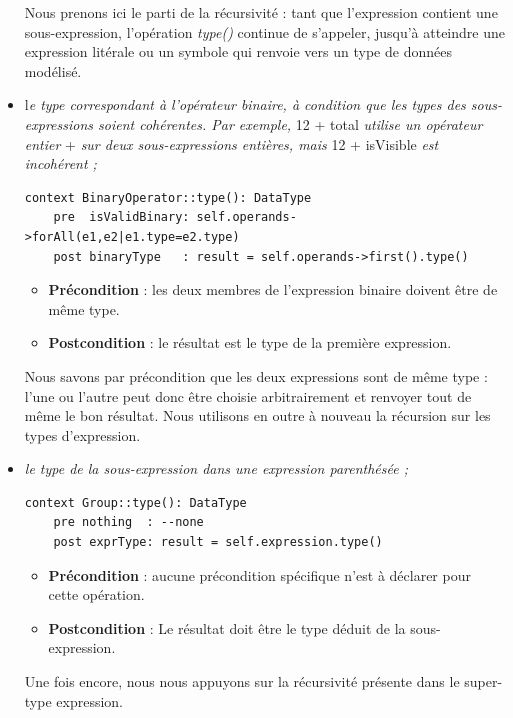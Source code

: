 \documentclass[oneside,a4paper]{book}
\begin{document}
\begin{itemize}
    Nous prenons ici le parti de la récursivité : tant que l'expression contient une sous-expression, l'opération \textit{type()} continue de s'appeler, jusqu'à atteindre une expression litérale ou un symbole qui renvoie vers un type de données modélisé.

    \item l\textit{e type correspondant à l'opérateur binaire, à condition que les types des sous-expressions soient cohérentes. Par exemple,} 12 + total \textit{utilise un opérateur entier} + \textit{sur deux sous-expressions entières, mais} 12 + isVisible \textit{est incohérent ;}
    \begin{lstlisting}
context BinaryOperator::type(): DataType
    pre  isValidBinary: self.operands->forAll(e1,e2|e1.type=e2.type)
    post binaryType   : result = self.operands->first().type()
    \end{lstlisting}

    \begin{itemize}
        \item \textbf{Précondition} : les deux membres de l'expression binaire doivent être de même type.
        \item \textbf{Postcondition} : le résultat est le type de la première expression. 
    \end{itemize}
    
    Nous savons par précondition que les deux expressions sont de même type : l'une ou l'autre peut donc être choisie arbitrairement et renvoyer tout de même le bon résultat. Nous utilisons en outre à nouveau la récursion sur les types d'expression.

    \item \textit{le type de la sous-expression dans une expression parenthésée ;}
    \begin{lstlisting}
context Group::type(): DataType
    pre nothing  : --none
    post exprType: result = self.expression.type()
    \end{lstlisting}
    \begin{itemize}
        \item \textbf{Précondition} : aucune précondition spécifique n'est à déclarer pour cette opération.
        \item \textbf{Postcondition} : Le résultat doit être le type déduit de la sous-expression.
    \end{itemize}
    
    Une fois encore, nous nous appuyons sur la récursivité présente dans le super-type expression.


\end{itemize}
\end{document}
